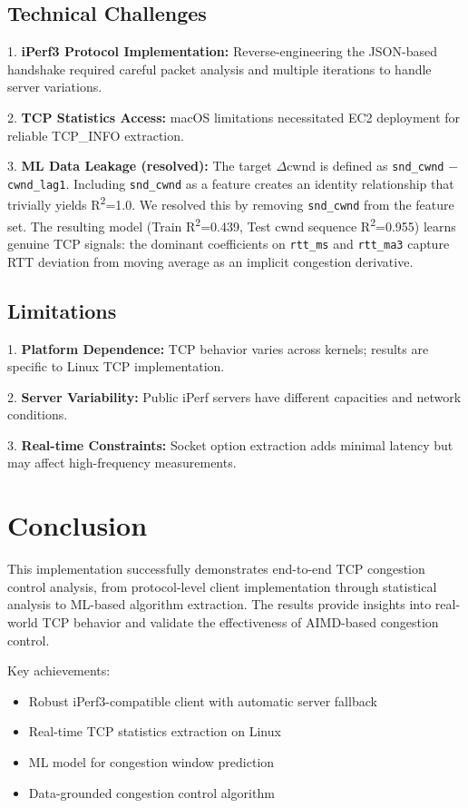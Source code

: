 \documentclass[11pt]{article}
\begin{document}
\subsection{Technical Challenges}

1. \textbf{iPerf3 Protocol Implementation:} Reverse-engineering the JSON-based handshake required careful packet analysis and multiple iterations to handle server variations.

2. \textbf{TCP Statistics Access:} macOS limitations necessitated EC2 deployment for reliable TCP\_INFO extraction.

3. \textbf{ML Data Leakage (resolved):} The target $\Delta$cwnd is defined as \texttt{snd\_cwnd} $-$ \texttt{cwnd\_lag1}. Including \texttt{snd\_cwnd} as a feature creates an identity relationship that trivially yields R\textsuperscript{2}=1.0. We resolved this by removing \texttt{snd\_cwnd} from the feature set. The resulting model (Train R\textsuperscript{2}=0.439, Test cwnd sequence R\textsuperscript{2}=0.955) learns genuine TCP signals: the dominant coefficients on \texttt{rtt\_ms} and \texttt{rtt\_ma3} capture RTT deviation from moving average as an implicit congestion derivative.

\subsection{Limitations}

1. \textbf{Platform Dependence:} TCP behavior varies across kernels; results are specific to Linux TCP implementation.

2. \textbf{Server Variability:} Public iPerf servers have different capacities and network conditions.

3. \textbf{Real-time Constraints:} Socket option extraction adds minimal latency but may affect high-frequency measurements.

\section{Conclusion}

This implementation successfully demonstrates end-to-end TCP congestion control analysis, from protocol-level client implementation through statistical analysis to ML-based algorithm extraction. The results provide insights into real-world TCP behavior and validate the effectiveness of AIMD-based congestion control.

Key achievements:
\begin{itemize}
    \item Robust iPerf3-compatible client with automatic server fallback
    \item Real-time TCP statistics extraction on Linux
    \item ML model for congestion window prediction
    \item Data-grounded congestion control algorithm
\end{itemize}
\end{document}
